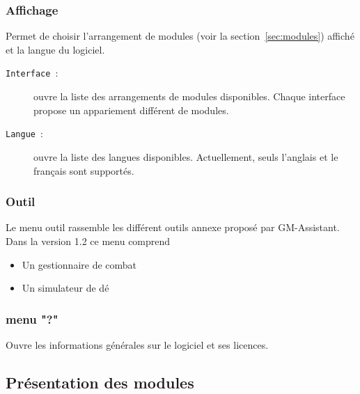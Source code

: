 \documentclass[a4paper,12pt]{article}
\newcommand*{\GMA}{GM-Assistant\xspace}
\newcommand*{\interfaceitem}[1]{\texttt{#1}}
\begin{document}
\subsubsection{Affichage}
Permet de choisir l'arrangement de modules (voir la section~\ref{sec:modules}) affiché et la langue du logiciel.
\begin{description}
    \item[\interfaceitem{Interface}~:]{ouvre la liste des arrangements de modules disponibles.
        Chaque interface propose un appariement différent de modules.}
    \item[\interfaceitem{Langue}~:]{ouvre la liste des langues disponibles.
        Actuellement, seuls l'anglais et le français sont supportés.}
\end{description}

\subsubsection{Outil}
Le menu outil rassemble les différent outils annexe proposé par \GMA.
Dans la version 1.2 ce menu comprend
\begin{itemize}
    \item Un gestionnaire de combat
    \item Un simulateur de dé
\end{itemize}

\subsubsection{menu "?"} Ouvre les informations générales sur le logiciel et ses licences.

\subsection{Présentation des modules}\label{modules}
\label{sec:modules}
\end{document}
